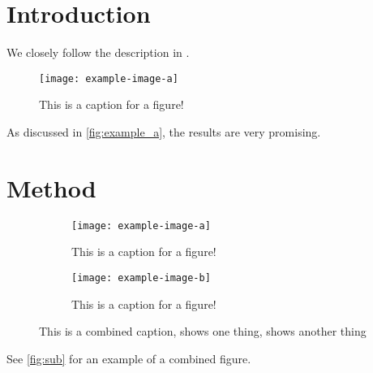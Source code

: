 \documentclass[12pt,a4paper]{scrarticle}
\begin{document}
\maketitle

\begin{abstract}
    \lipsum[2-4] 
\end{abstract}

\tableofcontents

\section{Introduction}

We closely follow the description in \cite{adams1995}.

\begin{figure}[ht]
    \centering
    \texttt{[image: example-image-a]}
    \caption{This is a caption for a figure!}
    \label{fig:example_a}
\end{figure}

\lipsum[1] 

As discussed in \autoref{fig:example_a}, the results are very promising.

\section{Method}

\begin{figure}[ht]
    \begin{subfigure}{0.5\textwidth}
        \centering
        \texttt{[image: example-image-a]}
        \caption{This is a caption for a figure!}
        \label{fig:sub:example_a}
    \end{subfigure}
    \begin{subfigure}{0.5\textwidth}
        \centering
        \texttt{[image: example-image-b]}
        \caption{This is a caption for a figure!}
        \label{fig:sub:example_b}
    \end{subfigure}

    \caption{This is a combined caption,  shows one
    thing,  shows another thing}
    \label{fig:sub}
\end{figure}

\lipsum[1] 

See \autoref{fig:sub} for an example of a combined figure.

\lipsum[1] 
\end{document}

